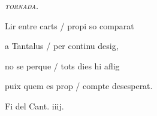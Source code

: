 \documentclass[12pt]{article}
\begin{document}
\begin{estrofaExtra}%




\begin{tornada}

\pagina{[140r]} \textit{\textsc{tornada.}}

\end{tornada}


\end{estrofaExtra}


\begin{estrofa}

 Lir entre carts / propi so comparat

 a Tantalus / per continu desig,

 no se perque / tots dies hi aflig

 puix quem es prop / compte desesperat.

\end{estrofa}



\begin{estrofaExtra}%

\begin{final}

Fi del Cant. iiij.

\end{final}

\end{estrofaExtra}
\end{document}
